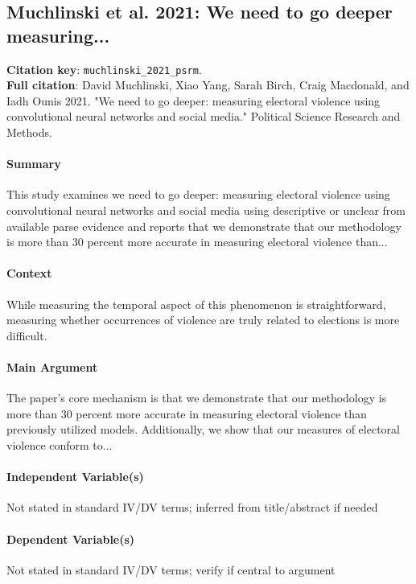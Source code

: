 \documentclass[12pt]{article}
\begin{document}
\subsection{Muchlinski et al. 2021: We need to go deeper measuring...}
\textbf{Citation key}: \texttt{muchlinski\_2021\_psrm}.\\
\textbf{Full citation}: David Muchlinski, Xiao Yang, Sarah Birch, Craig Macdonald, and Iadh Ounis 2021. "We need to go deeper: measuring electoral violence using convolutional neural networks and social media." Political Science Research and Methods.

\paragraph{Summary} This study examines we need to go deeper: measuring electoral violence using convolutional neural networks and social media using descriptive or unclear from available parse evidence and reports that we demonstrate that our methodology is more than 30 percent more accurate in measuring electoral violence than...

\paragraph{Context} While measuring the temporal aspect of this phenomenon is straightforward, measuring whether occurrences of violence are truly related to elections is more difficult.

\paragraph{Main Argument} The paper's core mechanism is that we demonstrate that our methodology is more than 30 percent more accurate in measuring electoral violence than previously utilized models. Additionally, we show that our measures of electoral violence conform to...

\paragraph{Independent Variable(s)} Not stated in standard IV/DV terms; inferred from title/abstract if needed

\paragraph{Dependent Variable(s)} Not stated in standard IV/DV terms; verify if central to argument
\end{document}
